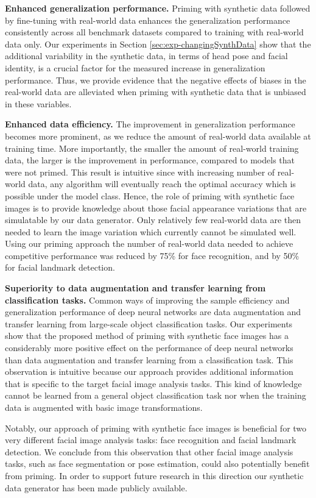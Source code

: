 \documentclass[10pt,twocolumn,letterpaper]{article}
\begin{document}
	\textbf{Enhanced generalization performance.} Priming with synthetic data followed by fine-tuning with real-world data enhances the generalization performance consistently across all benchmark datasets compared to training with real-world data only. Our experiments in Section \ref{sec:exp-changingSynthData} show that the additional variability in the synthetic data, in terms of head pose and facial identity, is a crucial factor for the measured increase in generalization performance. Thus, we provide evidence that the negative effects of biases in the real-world data are alleviated when priming with synthetic data that is unbiased in these variables.
	
	\textbf{Enhanced data efficiency.} The improvement in generalization performance becomes more prominent, as we reduce the amount of real-world data available at training time. More importantly, the smaller the amount of real-world training data, the larger is the improvement in performance, compared to models that were not primed. This result is intuitive since with increasing number of real-world data, any algorithm will eventually reach the optimal accuracy which is possible under the model class. Hence, the role of priming with synthetic face images is to provide knowledge about those facial appearance variations that are simulatable by our data generator. Only relatively few real-world data are then needed to learn the image variation which currently cannot be simulated well. Using our priming approach the number of real-world data needed to achieve competitive performance was reduced by 75\% for face recognition, and by 50\% for facial landmark detection.
	
	\textbf{Superiority to data augmentation and transfer learning from classification tasks.} Common ways of improving the sample efficiency and generalization performance of deep neural networks are data augmentation and transfer learning from large-scale object classification tasks. Our experiments show that the proposed method of priming with synthetic face images has a considerably more positive effect on the performance of deep neural networks than data augmentation and transfer learning from a classification task. This observation is intuitive because our approach provides additional information that is specific to the target facial image analysis tasks. This kind of knowledge cannot be learned from a general object classification task nor when the training data is augmented with basic image transformations.

	Notably, our approach of priming with synthetic face images is beneficial for two very different facial image analysis tasks: face recognition and facial landmark detection. We conclude from this observation that other facial image analysis tasks, such as face segmentation or pose estimation, could also potentially benefit from priming. In order to support future research in this direction our synthetic data generator has been made publicly available. 
	
\end{document}
